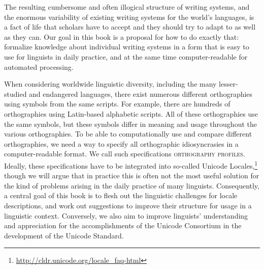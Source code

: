The resulting cumbersome and often illogical structure of writing systems, and
the enormous variability of existing writing systems for the world's languages, 
is a fact of life that scholars have to accept and they should try to adapt to as well as
they can. Our goal in this book is a proposal for how to do exactly that: formalize 
knowledge about individual writing systems in a form that is easy to use 
for linguists in daily practice, and at the same time computer-readable for 
automated processing.

When considering worldwide linguistic diversity, including the many
lesser-studied and endangered languages, there exist numerous different
orthographies using symbols from the same scripts. For example, there are
hundreds of orthographies using Latin-based alphabetic scripts. All of these
orthographies use the same symbols, but these symbols differ in meaning and
usage throughout the various orthographies. To be able to computationally use
and compare different orthographies, we need a way to specify all orthographic
idiosyncrasies in a computer-readable format. We call such specifications
\textsc{orthography profiles}. Ideally, these specifications have to be
integrated into so-called Unicode Locales,\footnote{\url{http://cldr.unicode.org/locale_faq-html}} 
though we will argue that in practice this is often not the most useful solution for the kind of problems
arising in the daily practice of many linguists. Consequently, a central goal of
this book is to flesh out the linguistic challenges for locale descriptions,
and work out suggestions to improve their structure for usage in a linguistic
context. Conversely, we also aim to improve linguists' understanding and
appreciation for the accomplishments of the Unicode Consortium in the
development of the Unicode Standard.



